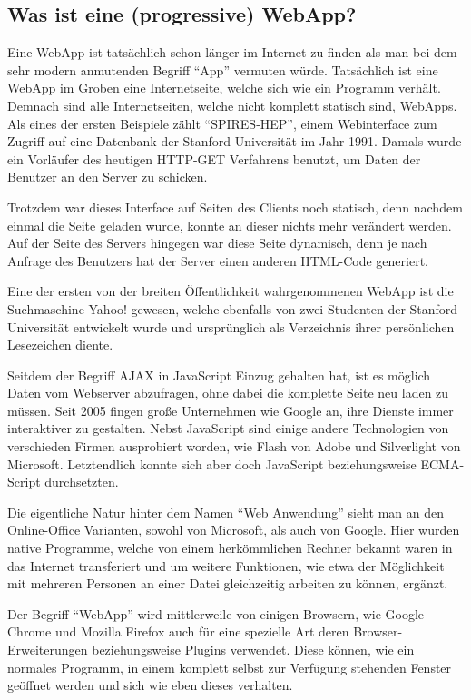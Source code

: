 \documentclass[a4paper,12pt,ngerman,listof=numbered]{scrartcl}      %
\let\oldcite\cite
\renewcommand{\cite}[1]{\textsuperscript{\oldcite{#1}}}
\begin{document}
	\subsection{Was ist eine (progressive) WebApp?}
	Eine WebApp ist tatsächlich schon länger im Internet zu finden als man bei dem sehr modern anmutenden Begriff ``App'' vermuten würde. Tatsächlich ist eine WebApp im Groben eine Internetseite, welche sich wie ein Programm verhält. Demnach sind alle Internetseiten, welche nicht komplett statisch sind, WebApps. Als eines der ersten Beispiele zählt ``SPIRES-HEP'', einem Webinterface zum Zugriff auf eine Datenbank der Stanford Universität im Jahr 1991. Damals wurde ein Vor\-läu\-fer des heutigen HTTP-GET Verfahrens benutzt, um Daten der Benutzer an den Server zu schicken.\par
	Trotzdem war dieses Interface auf Seiten des Clients noch statisch, denn nachdem einmal die Seite geladen wurde, konnte an dieser nichts mehr verändert werden. Auf der Seite des Servers hingegen war diese Seite dynamisch, denn je nach Anfrage des Benutzers hat der Server einen anderen HTML-Code generiert.\par
	Eine der ersten von der breiten Öffentlichkeit wahrgenommenen WebApp ist die Suchmaschine Yahoo! gewesen, welche ebenfalls von zwei Studenten der Stanford Universität entwickelt wurde und ursprünglich als Verzeichnis ihrer persönlichen Lesezeichen diente.\cite{webappWiki}\par
	Seitdem der Begriff AJAX in JavaScript Einzug gehalten hat, ist es möglich Daten vom Webserver abzufragen, ohne dabei die komplette Seite neu laden zu müssen. Seit 2005 fingen große Unternehmen wie Google an, ihre Dienste immer interaktiver zu gestalten. Nebst JavaScript sind einige andere Technologien von verschieden Firmen ausprobiert worden, wie Flash von Adobe und Silverlight von Microsoft. Letztendlich konnte sich aber doch JavaScript beziehungsweise ECMA-Script durchsetzten.\cite{webappWikiEN}\par
	Die eigentliche Natur hinter dem Namen ``Web Anwendung'' sieht man an den Online-Office Varianten, sowohl von Microsoft, als auch von Google. Hier wurden native Programme, welche von einem herkömmlichen Rechner bekannt waren in das Internet transferiert und um weitere Funktionen, wie etwa der Möglichkeit mit mehreren Personen an einer Datei gleichzeitig arbeiten zu können, ergänzt.\par
	Der Begriff ``WebApp'' wird mittlerweile von einigen Browsern, wie Google Chrome und Mozilla Firefox auch für eine spezielle Art deren Browser-Erweiterungen beziehungsweise Plugins verwendet. Diese können, wie ein normales Programm, in einem komplett selbst zur Verfügung stehenden Fenster geöffnet werden und sich wie eben dieses verhalten.\cite{chromeWebStore}\par
\end{document}
